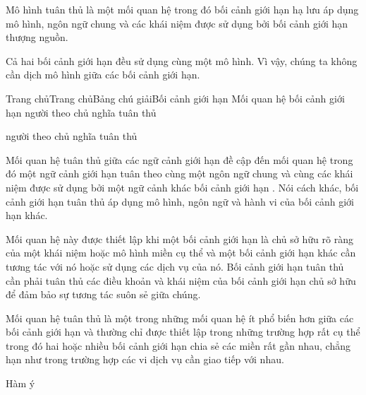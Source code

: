 Mô hình tuân thủ là một mối quan hệ trong đó bối cảnh giới hạn hạ lưu áp dụng mô hình, ngôn ngữ chung và các khái niệm được sử dụng bởi bối cảnh giới hạn thượng nguồn.

Cả hai bối cảnh giới hạn đều sử dụng cùng một mô hình. Vì vậy, chúng ta không cần dịch mô hình giữa các bối cảnh giới hạn.










Trang chủTrang chủBảng chú giảiBối cảnh giới hạn Mối quan hệ bối cảnh giới hạn người theo chủ nghĩa tuân thủ

người theo chủ nghĩa tuân thủ

Mối quan hệ tuân thủ giữa các ngữ cảnh giới hạn đề cập đến mối quan hệ trong đó một ngữ cảnh giới hạn tuân theo cùng một ngôn ngữ chung và cùng các khái niệm được sử dụng bởi một ngữ cảnh khác bối cảnh giới hạn . Nói cách khác, bối cảnh giới hạn tuân thủ áp dụng mô hình, ngôn ngữ và hành vi của bối cảnh giới hạn khác.

Mối quan hệ này được thiết lập khi một bối cảnh giới hạn là chủ sở hữu rõ ràng của một khái niệm hoặc mô hình miền cụ thể và một bối cảnh giới hạn khác cần tương tác với nó hoặc sử dụng các dịch vụ của nó. Bối cảnh giới hạn tuân thủ cần phải tuân thủ các điều khoản và khái niệm của bối cảnh giới hạn chủ sở hữu để đảm bảo sự tương tác suôn sẻ giữa chúng.

Mối quan hệ tuân thủ là một trong những mối quan hệ ít phổ biến hơn giữa các bối cảnh giới hạn và thường chỉ được thiết lập trong những trường hợp rất cụ thể trong đó hai hoặc nhiều bối cảnh giới hạn chia sẻ các miền rất gần nhau, chẳng hạn như trong trường hợp các vi dịch vụ cần giao tiếp với nhau.

Hàm ý

